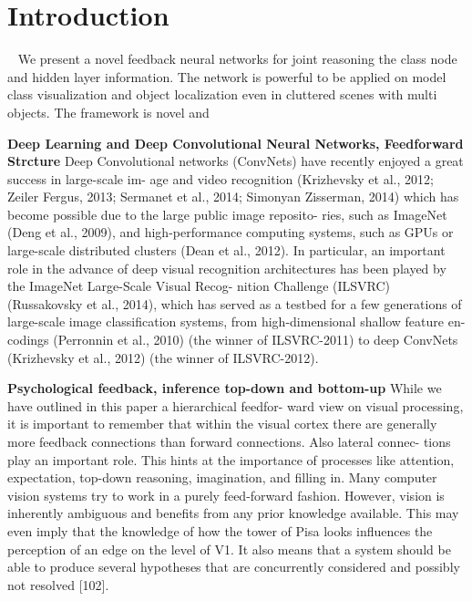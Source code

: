 \section{Introduction}

~\cite{a}
We present a novel feedback neural networks for joint reasoning the class node and hidden layer information. The network is powerful to be applied on model class visualization and object localization even in cluttered scenes with multi objects. The framework is novel and 

\textbf{Deep Learning and Deep Convolutional Neural Networks, Feedforward Strcture}
Deep Convolutional networks (ConvNets) have recently enjoyed a great success in large-scale im- age and video recognition (Krizhevsky et al., 2012; Zeiler Fergus, 2013; Sermanet et al., 2014; Simonyan Zisserman, 2014) which has become possible due to the large public image reposito- ries, such as ImageNet (Deng et al., 2009), and high-performance computing systems, such as GPUs or large-scale distributed clusters (Dean et al., 2012). In particular, an important role in the advance of deep visual recognition architectures has been played by the ImageNet Large-Scale Visual Recog- nition Challenge (ILSVRC) (Russakovsky et al., 2014), which has served as a testbed for a few generations of large-scale image classification systems, from high-dimensional shallow feature en- codings (Perronnin et al., 2010) (the winner of ILSVRC-2011) to deep ConvNets (Krizhevsky et al., 2012) (the winner of ILSVRC-2012). 

\textbf{Psychological feedback, inference top-down and bottom-up}
While we have outlined in this paper a hierarchical feedfor- ward view on visual processing, it is important to remember that within the visual cortex there are generally more feedback connections than forward connections. Also lateral connec- tions play an important role. This hints at the importance of processes like attention, expectation, top-down reasoning, imagination, and filling in. Many computer vision systems try to work in a purely feed-forward fashion. However, vision is inherently ambiguous and benefits from any prior knowledge available. This may even imply that the knowledge of how the tower of Pisa looks influences the perception of an edge on the level of V1. It also means that a system should be able to produce several hypotheses that are concurrently considered and possibly not resolved [102]. 

